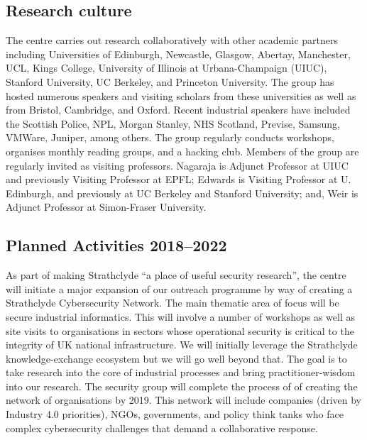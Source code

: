 \documentclass[11pt]{article}
\begin{document}
    
    \subsection{Research culture}
    The centre carries out research collaboratively with other academic partners
    including Universities of Edinburgh, Newcastle, Glasgow, Abertay,
    Manchester, UCL, Kings College, University of Illinois at
    Urbana-Champaign (UIUC), Stanford University, UC Berkeley, and
    Princeton University.  The group has hosted numerous speakers and
    visiting scholars from these universities as well as from Bristol,
    Cambridge, and Oxford. Recent industrial speakers have included
    the Scottish Police, NPL, Morgan Stanley, NHS Scotland, Previse,
    Samsung, VMWare, Juniper, among others. The group regularly
    conducts workshops, organises monthly reading groups, and a
    hacking club. Members of the group are regularly invited as
    visiting professors. Nagaraja is Adjunct Professor at UIUC and previously Visiting Professor at EPFL; Edwards is Visiting Professor at U. Edinburgh, and previously at UC Berkeley and Stanford University; and, Weir is Adjunct Professor at Simon-Fraser University.



    \subsection{Planned Activities 2018--2022}
    As part of making Strathclyde ``a place of useful security
    research'', the centre will initiate a major expansion of our outreach
    programme by way of creating a Strathclyde Cybersecurity
    Network. The main thematic area of focus will be secure industrial
    informatics. This will involve a number of workshops as well as
    site visits to organisations in sectors whose operational security
    is critical to the integrity of UK national infrastructure. We
    will initially leverage the Strathclyde knowledge-exchange
    ecosystem but we will go well beyond that. The goal is to take
    research into the core of industrial processes and bring
    practitioner-wisdom into our research. The security group will
    complete the process of of creating the network of organisations
    by 2019. This network will include companies (driven by Industry
    4.0 priorities), NGOs, governments, and policy think tanks who
    face complex cybersecurity challenges that demand a collaborative
    response.
\end{document}
